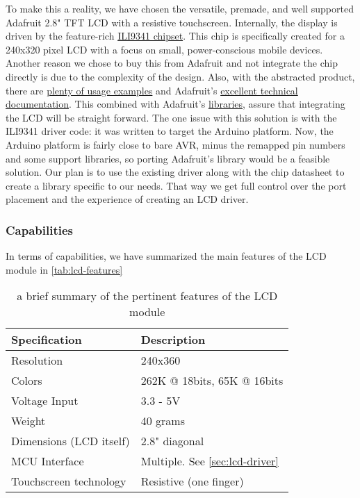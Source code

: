 To make this a reality, we have chosen the versatile, premade, and well
supported Adafruit 2.8" TFT LCD\footnotemark{} with a resistive touchscreen.
Internally, the display is driven by the feature-rich
\href{http://www.newhavendisplay.com/app_notes/ILI9341.pdf}{ILI9341 chipset}.
This chip is specifically created for a 240x320 pixel LCD with a focus on
small, power-conscious mobile devices. Another reason we chose to buy this from
Adafruit and not integrate the chip directly is due to the complexity of the
design. Also, with the abstracted product, there are
\href{https://github.com/adafruit/Adafruit_ILI9341/tree/master/examples}{plenty
of usage examples} and Adafruit's
\href{https://learn.adafruit.com/adafruit-2-dot-8-color-tft-touchscreen-breakout-v2}{excellent
technical documentation}. This combined with Adafruit's
\href{https://github.com/adafruit/Adafruit_ILI9341}{libraries}, assure
that integrating the LCD will be straight forward. The one issue with
this solution is with the ILI9341 driver code: it was written to target the
Arduino platform. Now, the Arduino platform is fairly close to bare AVR, minus
the remapped pin numbers and some support libraries, so porting Adafruit's
library would be a feasible solution. Our plan is to use the existing driver
along with the chip datasheet to create a library specific to our needs. That
way we get full control over the port placement and the experience of creating
an LCD driver.


\subsubsection{Capabilities}
In terms of capabilities, we have summarized the main features of the LCD module in \autoref{tab:lcd-features}

\begin{table}[H]
\centering
\begin{tabular}{|l|l|}
\hline
\bfseries Specification & \bfseries Description \\ \hline
Resolution & 240x360 \\ \hline
Colors & 262K @ 18bits, 65K @ 16bits \\ \hline
Voltage Input & 3.3 - 5V \\ \hline
Weight & 40 grams \\ \hline
Dimensions (LCD itself) & 2.8" diagonal \\ \hline
MCU Interface & Multiple. See \autoref{sec:lcd-driver}\\ \hline
Touchscreen technology & Resistive (one finger)\\
\hline
\end{tabular}
\caption{a brief summary of the pertinent features of the LCD module}
\label{tab:lcd-features}
\end{table}

